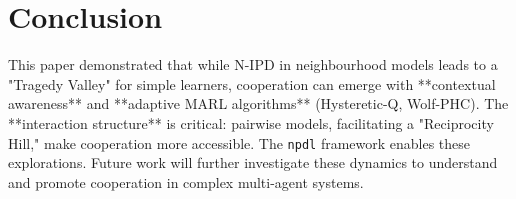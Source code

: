 \documentclass[]{llncs} %
\begin{document}
\section{Conclusion}
\label{sec:conclusion}
This paper demonstrated that while N-IPD in neighbourhood models leads to a "Tragedy Valley" for simple learners, cooperation can emerge with **contextual awareness** and **adaptive MARL algorithms** (Hysteretic-Q, Wolf-PHC). The **interaction structure** is critical: pairwise models, facilitating a "Reciprocity Hill," make cooperation more accessible. The \texttt{npdl} framework enables these explorations. Future work will further investigate these dynamics to understand and promote cooperation in complex multi-agent systems.


\end{document}
